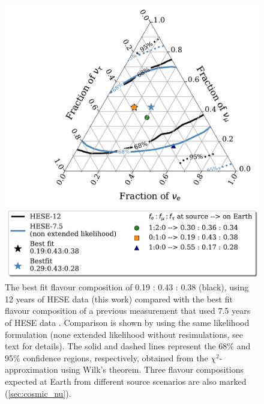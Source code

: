 \begin{figure}[h!]
    \caption[Profile likelihood scan of the astrophysical neutrino flavor composition at Earth, comparison with HESE-7.5 non extended likelihood]{The best fit flavour composition of 0.19 : 0.43 : 0.38 (black), using 12 years of HESE data (this work) compared with the best fit flavour composition of a previous measurement that used 7.5 years of HESE data \cite{Juliana_paper}. Comparison is shown by using the same likelihood formulation (none extended likelihood without resimulations, see text for details). The solid and dashed lines represent the 68\% and 95\% confidence regions, respectively, obtained from the $\chi^2$-approximation using Wilk's theorem. Three flavour compositions expected at Earth from different source scenarios are also marked (\ref{sec:cosmic_nu}).}
    \includegraphics{./figures/results/HESE7and12_nonextendedonly.pdf}


    
\end{figure}


